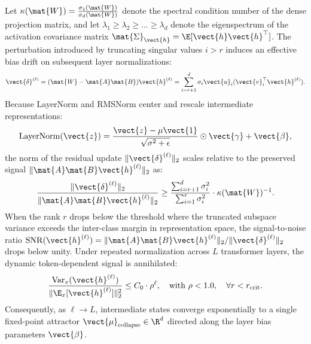 Let $\kappa(\mat{W}) = \frac{\sigma_1(\mat{W})}{\sigma_d(\mat{W})}$ denote the spectral condition number of the dense projection matrix, and let $\lambda_1 \ge \lambda_2 \ge \dots \ge \lambda_d$ denote the eigenspectrum of the activation covariance matrix $\mat{\Sigma}_{\vect{h}} = \E[\vect{h} \vect{h}^\top]$. The perturbation introduced by truncating singular values $i > r$ induces an effective bias drift on subsequent layer normalizations:
\begin{equation}
\vect{\delta}^{(\ell)} = (\mat{W} - \mat{A}\mat{B})\vect{h}^{(\ell)} = \sum_{i=r+1}^{d} \sigma_i \vect{u}_i (\vect{v}_i^\top \vect{h}^{(\ell)}).
\end{equation}
Because LayerNorm and RMSNorm center and rescale intermediate representations:
\begin{equation}
\operatorname{LayerNorm}(\vect{z}) = \frac{\vect{z} - \mu \vect{1}}{\sqrt{\sigma^2 + \epsilon}} \odot \vect{\gamma} + \vect{\beta},
\end{equation}
the norm of the residual update $\|\vect{\delta}^{(\ell)}\|_2$ scales relative to the preserved signal $\|\mat{A}\mat{B}\vect{h}^{(\ell)}\|_2$ as:
\begin{equation}
\frac{\|\vect{\delta}^{(\ell)}\|_2}{\|\mat{A}\mat{B}\vect{h}^{(\ell)}\|_2} \ge \frac{\sum_{i=r+1}^{d} \sigma_i^2}{\sum_{i=1}^{r} \sigma_i^2} \cdot \kappa(\mat{W})^{-1}.
\end{equation}
When the rank $r$ drops below the threshold where the truncated subspace variance exceeds the inter-class margin in representation space, the signal-to-noise ratio $\operatorname{SNR}(\vect{h}^{(\ell)}) = \|\mat{A}\mat{B}\vect{h}^{(\ell)}\|_2 / \|\vect{\delta}^{(\ell)}\|_2$ drops below unity. Under repeated normalization across $L$ transformer layers, the dynamic token-dependent signal is annihilated:
\begin{equation}
\frac{\operatorname{Var}_{x}(\vect{h}^{(\ell)})}{\|\E_{x}[\vect{h}^{(\ell)}]\|_2^2} \le C_0 \cdot \rho^\ell, \quad \text{with } \rho < 1.0, \quad \forall r < r_{\text{crit}}.
\end{equation}
Consequently, as $\ell \to L$, intermediate states converge exponentially to a single fixed-point attractor $\vect{\mu}_{\text{collapse}} \in \R^d$ directed along the layer bias parameters $\vect{\beta}$.

